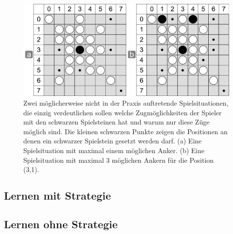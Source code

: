 \begin{figure}[!htbp]
  \centering
  \includegraphics[scale=0.5]{inhalt/abbildungen/zuege_schwarz_reversi.pdf}
  \caption{Zwei möglicherweise nicht in der Praxis auftretende Spielsituationen, die einzig verdeutlichen sollen welche Zugmöglichkeiten der Spieler mit den schwarzen Spielsteinen hat und warum nur diese Züge möglich sind. Die kleinen schwarzen Punkte zeigen die Positionen an denen ein schwarzer Spielstein gesetzt werden darf. (a) Eine Spielsituation mit maximal einem möglichen Anker. (b) Eine Spielsituation mit maximal 3 möglichen Ankern für die Position (3,1).}
  \label{fig:zuege_schwarz_reversi}
\end{figure}


\subsection{Lernen mit Strategie}

\subsection{Lernen ohne Strategie}




